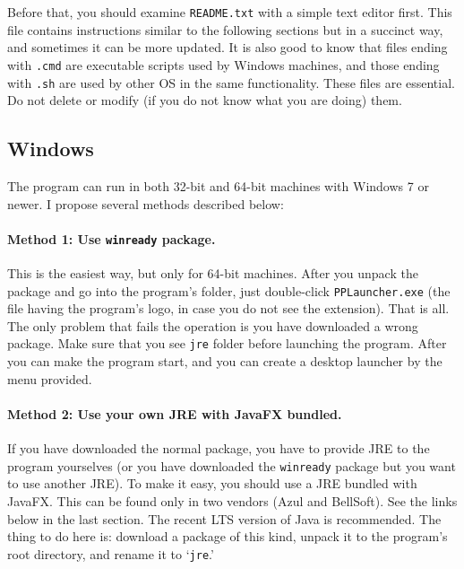 Before that, you should examine \texttt{README.txt} with a simple text editor first. This file contains instructions similar to the following sections but in a succinct way, and sometimes it can be more updated. It is also good to know that files ending with \texttt{.cmd} are executable scripts used by Windows machines, and those ending with \texttt{.sh} are used by other OS in the same functionality. These files are essential. Do not delete or modify (if you do not know what you are doing) them.

\subsection{Windows}

The program can run in both 32-bit and 64-bit machines with Windows 7 or newer. I propose several methods described below:

\paragraph{Method 1: Use \texttt{winready} package.} This is the easiest way, but only for 64-bit machines. After you unpack the package and go into the program's folder, just double-click \texttt{PPLauncher.exe} (the file having the program's logo, in case you do not see the extension). That is all. The only problem that fails the operation is you have downloaded a wrong package. Make sure that you see \texttt{jre} folder before launching the program. After you can make the program start, and you can create a desktop launcher by the menu provided.


\paragraph{Method 2: Use your own JRE with JavaFX bundled.} If you have downloaded the normal package, you have to provide JRE to the program yourselves (or you have downloaded the \texttt{winready} package but you want to use another JRE). To make it easy, you should use a JRE bundled with JavaFX. This can be found only in two vendors (Azul and BellSoft). See the links below in the last section. The recent LTS version of Java is recommended. The thing to do here is: download a package of this kind, unpack it to the program's root directory, and rename it to `\texttt{jre}.'

